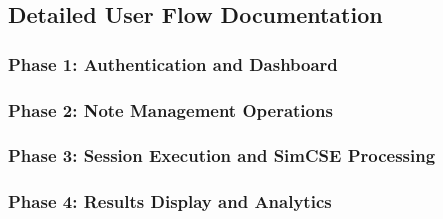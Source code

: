 
\clearpage
\subsection{Detailed User Flow Documentation}


\subsubsection{Phase 1: Authentication and Dashboard}


\subsubsection{Phase 2: Note Management Operations}


\subsubsection{Phase 3: Session Execution and SimCSE Processing}


\subsubsection{Phase 4: Results Display and Analytics}

